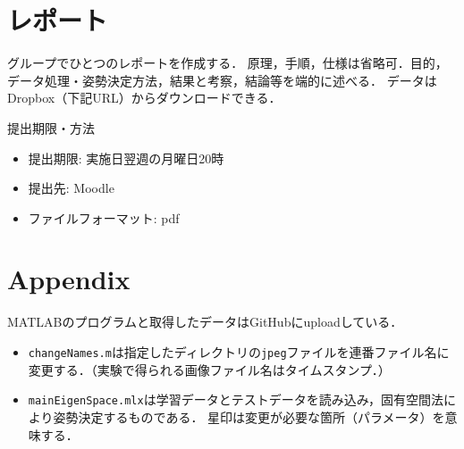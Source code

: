 \documentclass{article}
\begin{document}

\vspace{\baselineskip}

\section{レポート}
グループでひとつのレポートを作成する．
原理，手順，仕様は省略可．目的，データ処理・姿勢決定方法，結果と考察，結論等を端的に述べる．
データはDropbox（下記URL）からダウンロードできる．

提出期限・方法
\begin{itemize}
    \item 提出期限: 実施日翌週の月曜日20時
    \item 提出先: Moodle
    \item ファイルフォーマット: pdf    
\end{itemize}

\section*{Appendix}
MATLABのプログラムと取得したデータはGitHubにuploadしている．
\begin{itemize}
    \item \texttt{changeNames.m}は指定したディレクトリの\texttt{jpeg}ファイルを連番ファイル名に変更する．（実験で得られる画像ファイル名はタイムスタンプ．）
    \item \texttt{mainEigenSpace.mlx}は学習データとテストデータを読み込み，固有空間法により姿勢決定するものである．
星印は変更が必要な箇所（パラメータ）を意味する．
\end{itemize}






\end{document}
